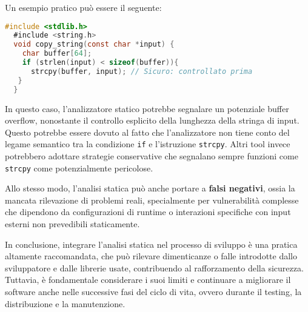 Un esempio pratico può essere il seguente:

\begin{lstlisting}[language=C]
  #include <stdlib.h>
  #include <string.h>
  void copy_string(const char *input) {
    char buffer[64];
    if (strlen(input) < sizeof(buffer)){
      strcpy(buffer, input); // Sicuro: controllato prima
   }
  }
\end{lstlisting}

In questo caso, l'analizzatore statico potrebbe segnalare un potenziale buffer
overflow, nonostante il controllo esplicito della lunghezza della stringa di input.
Questo potrebbe essere dovuto al fatto che l'analizzatore non tiene conto del
legame semantico tra la condizione \texttt{if} e l'istruzione \texttt{strcpy}. Altri
tool invece potrebbero adottare strategie conservative che segnalano sempre funzioni
come \texttt{strcpy} come potenzialmente pericolose.

Allo stesso modo, l'analisi statica può anche portare a \textbf{falsi negativi},
ossia la mancata rilevazione di problemi reali, specialmente per vulnerabilità
complesse che dipendono da configurazioni di runtime o interazioni specifiche
con input esterni non prevedibili staticamente.

In conclusione, integrare l'analisi statica nel processo di sviluppo è una pratica
altamente raccomandata, che può rilevare dimenticanze o falle introdotte dallo
sviluppatore e dalle librerie usate, contribuendo al rafforzamento della sicurezza.
Tuttavia, è fondamentale considerare i suoi limiti e continuare a migliorare il software
anche nelle successive fasi del ciclo di vita, ovvero durante il testing, la distribuzione
e la manutenzione.